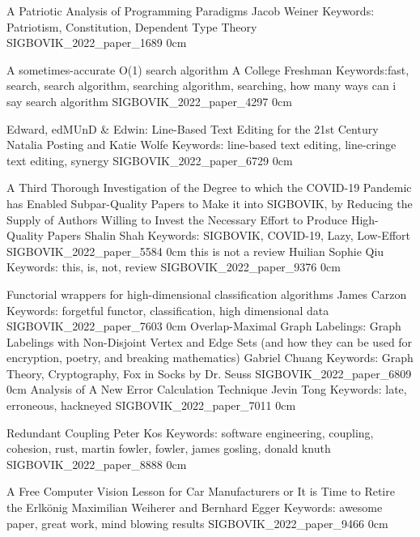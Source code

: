 \addpaper
    {A Patriotic Analysis of Programming Paradigms}
    {Jacob Weiner}
    {Keywords: Patriotism, Constitution, Dependent Type Theory}
    {SIGBOVIK_2022_paper_1689}
    {0cm}
    {}

\addpaper
    {A sometimes-accurate O(1) search algorithm}
    {A College Freshman}
    {Keywords:fast, search, search algorithm, searching algorithm, searching, how many ways can i say search algorithm}
    {SIGBOVIK_2022_paper_4297}
    {0cm}
    {}

\addpaper
    {Edward, edMUnD & Edwin: Line-Based Text Editing for the 21st Century}
    {Natalia Posting and Katie Wolfe}
    {Keywords: line-based text editing, line-cringe text editing, synergy}
    {SIGBOVIK_2022_paper_6729}
    {0cm}
    {}

\addpaper
    {A Third Thorough Investigation of the Degree to which the COVID-19 Pandemic has Enabled Subpar-Quality Papers to Make it into SIGBOVIK, by Reducing the Supply of Authors Willing to Invest the Necessary Effort to Produce High-Quality Papers}
    {Shalin Shah}
    {Keywords: SIGBOVIK, COVID-19, Lazy, Low-Effort}
    {SIGBOVIK_2022_paper_5584}
    {0cm}
    {}
\addpaper
    {this is not a review}
    {Huilian Sophie Qiu}
    {Keywords: this, is, not, review}
    {SIGBOVIK_2022_paper_9376}
    {0cm}
    {}


\addpaper
    {Functorial wrappers for high-dimensional classification algorithms}
    {James Carzon}
    {Keywords: forgetful functor, classification, high dimensional data}
    {SIGBOVIK_2022_paper_7603}
    {0cm}
    {}
\addpaper
    {Overlap-Maximal Graph Labelings: Graph Labelings with Non-Disjoint Vertex and Edge Sets (and how they can be used for encryption, poetry, and breaking mathematics)}
    {Gabriel Chuang}
    {Keywords: Graph Theory, Cryptography, Fox in Socks by Dr. Seuss}
    {SIGBOVIK_2022_paper_6809}
    {0cm}
    {}
\addpaper
    {Analysis of A New Error Calculation Technique}
    {Jevin Tong} 
    {Keywords: late, erroneous, hackneyed}
    {SIGBOVIK_2022_paper_7011}
    {0cm}
    {}

\addpaper
    {Redundant Coupling}
    {Peter Kos}
    {Keywords: software engineering, coupling, cohesion, rust, martin fowler, fowler, james gosling, donald knuth}
    {SIGBOVIK_2022_paper_8888}
    {0cm}
    {}

\addpaper
    {A Free Computer Vision Lesson for Car Manufacturers or It is Time to Retire the Erlkönig}
    {Maximilian Weiherer and Bernhard Egger}
    {Keywords: awesome paper, great work, mind blowing results}
    {SIGBOVIK_2022_paper_9466}
    {0cm}
    {}
